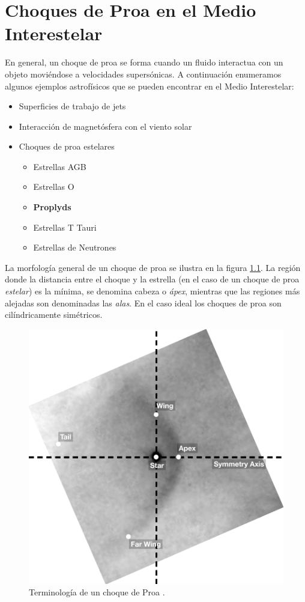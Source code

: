 \chapter[Choques de Proa]{Choques de Proa en el Medio Interestelar}
\thispagestyle{empty}

En general, un choque de proa se forma cuando un fluido interactua con un objeto moviéndose a velocidades supersónicas. A continuación enumeramos algunos ejemplos astrofísicos que se pueden encontrar en el Medio Interestelar:

\begin{itemize}
\item Superficies de trabajo de jets
\item Interacción de magnetósfera con el viento solar
\item Choques de proa estelares
  \begin{itemize}
  \item Estrellas AGB
  \item Estrellas O
  \item \textbf{Proplyds}
  \item Estrellas T Tauri
  \item Estrellas de Neutrones
  \end{itemize}
\end{itemize}

La morfología general de un choque de proa se ilustra en la figura \ref{fig:terminology}. La región donde la distancia entre el choque y la estrella (en el caso de un choque de proa \textit{estelar}) es la mínima, se denomina cabeza o \textit{ápex}, mientras que las regiones más alejadas son denominadas las \textit{alas}. En el caso ideal los choques de proa son cilíndricamente simétricos.

\begin{figure}
  \includegraphics[width=0.7\linewidth]{./Figures/bow-terminology}
  \caption{Terminología de un choque de Proa .}
  \label{fig:terminology}
\end{figure}

